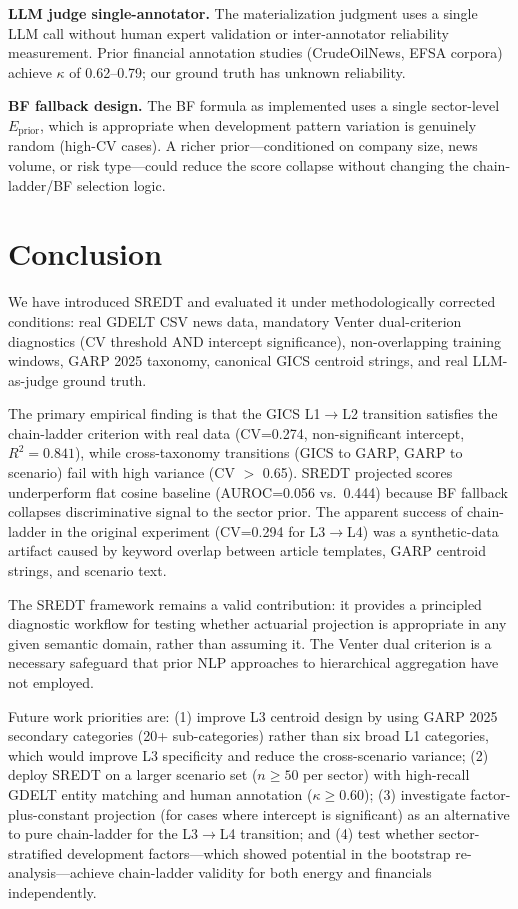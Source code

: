 \documentclass[11pt,letterpaper]{article}
\begin{document}
\textbf{LLM judge single-annotator.} The materialization judgment uses a single LLM call without human expert validation or inter-annotator reliability measurement. Prior financial annotation studies (CrudeOilNews, EFSA corpora) achieve $\kappa$ of 0.62--0.79; our ground truth has unknown reliability.

\textbf{BF fallback design.} The BF formula as implemented uses a single sector-level $E_\text{prior}$, which is appropriate when development pattern variation is genuinely random (high-CV cases). A richer prior---conditioned on company size, news volume, or risk type---could reduce the score collapse without changing the chain-ladder/BF selection logic.

\section{Conclusion}

We have introduced SREDT and evaluated it under methodologically corrected conditions: real GDELT CSV news data, mandatory Venter dual-criterion diagnostics (CV threshold AND intercept significance), non-overlapping training windows, GARP 2025 taxonomy, canonical GICS centroid strings, and real LLM-as-judge ground truth.

The primary empirical finding is that the GICS L1$\to$L2 transition satisfies the chain-ladder criterion with real data (CV=0.274, non-significant intercept, $R^2=0.841$), while cross-taxonomy transitions (GICS to GARP, GARP to scenario) fail with high variance (CV $>$ 0.65). SREDT projected scores underperform flat cosine baseline (AUROC=0.056 vs.~0.444) because BF fallback collapses discriminative signal to the sector prior. The apparent success of chain-ladder in the original experiment (CV=0.294 for L3$\to$L4) was a synthetic-data artifact caused by keyword overlap between article templates, GARP centroid strings, and scenario text.

The SREDT framework remains a valid contribution: it provides a principled diagnostic workflow for testing whether actuarial projection is appropriate in any given semantic domain, rather than assuming it. The Venter dual criterion is a necessary safeguard that prior NLP approaches to hierarchical aggregation have not employed.

Future work priorities are: (1) improve L3 centroid design by using GARP 2025 secondary categories (20+ sub-categories) rather than six broad L1 categories, which would improve L3 specificity and reduce the cross-scenario variance; (2) deploy SREDT on a larger scenario set ($n \geq 50$ per sector) with high-recall GDELT entity matching and human annotation ($\kappa \geq 0.60$); (3) investigate factor-plus-constant projection (for cases where intercept is significant) as an alternative to pure chain-ladder for the L3$\to$L4 transition; and (4) test whether sector-stratified development factors---which showed potential in the bootstrap re-analysis---achieve chain-ladder validity for both energy and financials independently.



\end{document}

